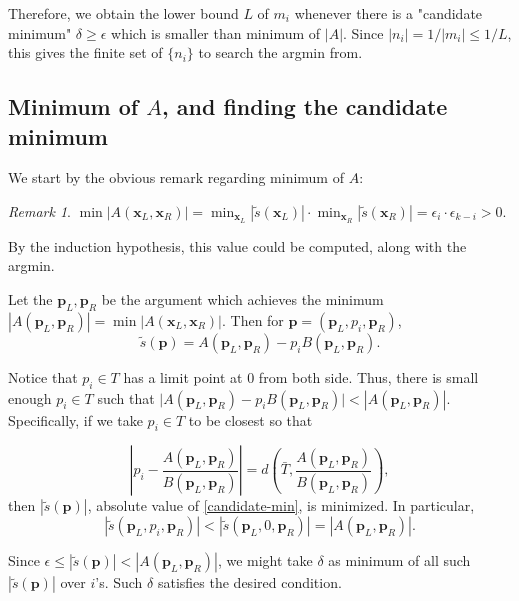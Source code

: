\documentclass{article}
\theoremstyle{definition}
\theoremstyle{plain}
\theoremstyle{remark}
\newtheorem*{remark}{Remark}
\numberwithin{equation}{section}
\newcommand{\abs}[1]{\left\lvert{#1}\right\rvert}
\begin{document}
Therefore, we obtain the lower bound $L$ of $m_i$
whenever there is a "candidate minimum" $\delta \geq \epsilon$
which is smaller than minimum of $\abs{A}$.
Since $\abs{n_i} = 1 / \abs{m_i} \leq 1 / L$, this gives the finite set of $\{ n_i \}$ to search the argmin from.

\subsection{Minimum of $A$, and finding the candidate minimum}

We start by the obvious remark regarding minimum of $A$:
\begin{remark}
  $\min \abs{A(\mathbf{x}_L, \mathbf{x}_R)}
  = \min_{\mathbf{x}_L} \abs{\tilde{s}(\mathbf{x}_L)} \cdot \min_{\mathbf{x}_R} \abs{\tilde{s}(\mathbf{x}_R)}
  = \epsilon_i \cdot \epsilon_{k-i} > 0$.
\end{remark}
By the induction hypothesis, this value could be computed, along with the argmin.

Let the $\mathbf{p}_L, \mathbf{p}_R$ be the argument
which achieves the minimum $\abs{A(\mathbf{p}_L, \mathbf{p}_R)} = \min \abs{A(\mathbf{x}_L, \mathbf{x}_R)}$.
Then for $\mathbf{p} = (\mathbf{p}_L, p_i, \mathbf{p}_R)$,
\begin{equation}\label{candidate-min}
  \tilde{s}(\mathbf{p}) = A(\mathbf{p}_L, \mathbf{p}_R) - p_i B(\mathbf{p}_L, \mathbf{p}_R).
\end{equation}

Notice that $p_i \in T$ has a limit point at $0$ from both side.
Thus, there is small enough $p_i \in T$
such that $\lvert A(\mathbf{p}_L, \mathbf{p}_R) - p_i B(\mathbf{p}_L, \mathbf{p}_R) \rvert
< \abs{A(\mathbf{p}_L, \mathbf{p}_R)}$.
Specifically, if we take $p_i \in T$ to be closest so that

\[
  \abs{p_i - \frac{A(\mathbf{p}_L, \mathbf{p}_R)}{B(\mathbf{p}_L, \mathbf{p}_R)}}
  = d \left( \bar{T}, \frac{A(\mathbf{p}_L, \mathbf{p}_R)}{B(\mathbf{p}_L, \mathbf{p}_R)} \right),
\]
then $\abs{\tilde{s}(\mathbf{p})}$, absolute value of \eqref{candidate-min}, is minimized.
In particular,
\[
  \abs{\tilde{s}(\mathbf{p}_L, p_i, \mathbf{p}_R)}
  < \abs{\tilde{s}(\mathbf{p}_L, 0, \mathbf{p}_R)} = \abs{A(\mathbf{p}_L, \mathbf{p}_R)}.
\]

Since $\epsilon \leq \abs{\tilde{s}(\mathbf{p})} < \abs{A(\mathbf{p}_L, \mathbf{p}_R)}$,
we might take $\delta$ as minimum of all such $\abs{\tilde{s}(\mathbf{p})}$ over $i$'s.
Such $\delta$ satisfies the desired condition.
\end{document}
